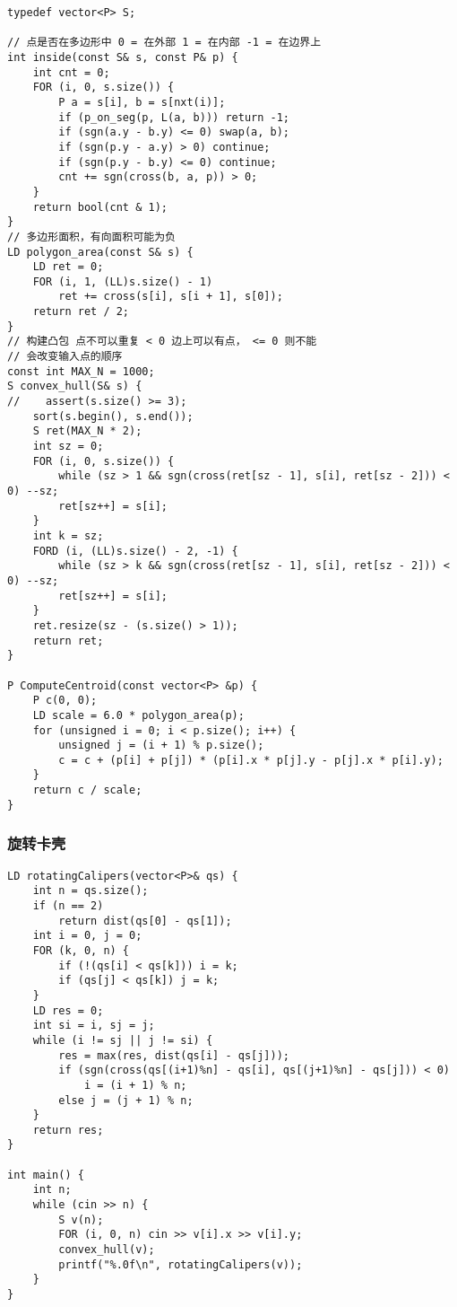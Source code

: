 \documentclass[]{article}
\begin{document}
\begin{verbatim}
typedef vector<P> S;

// 点是否在多边形中 0 = 在外部 1 = 在内部 -1 = 在边界上
int inside(const S& s, const P& p) {
    int cnt = 0;
    FOR (i, 0, s.size()) {
        P a = s[i], b = s[nxt(i)];
        if (p_on_seg(p, L(a, b))) return -1;
        if (sgn(a.y - b.y) <= 0) swap(a, b);
        if (sgn(p.y - a.y) > 0) continue;
        if (sgn(p.y - b.y) <= 0) continue;
        cnt += sgn(cross(b, a, p)) > 0;
    }
    return bool(cnt & 1);
}
// 多边形面积，有向面积可能为负
LD polygon_area(const S& s) {
    LD ret = 0;
    FOR (i, 1, (LL)s.size() - 1)
        ret += cross(s[i], s[i + 1], s[0]);
    return ret / 2;
}
// 构建凸包 点不可以重复 < 0 边上可以有点， <= 0 则不能
// 会改变输入点的顺序
const int MAX_N = 1000;
S convex_hull(S& s) {
//    assert(s.size() >= 3);
    sort(s.begin(), s.end());
    S ret(MAX_N * 2);
    int sz = 0;
    FOR (i, 0, s.size()) {
        while (sz > 1 && sgn(cross(ret[sz - 1], s[i], ret[sz - 2])) < 0) --sz;
        ret[sz++] = s[i];
    }
    int k = sz;
    FORD (i, (LL)s.size() - 2, -1) {
        while (sz > k && sgn(cross(ret[sz - 1], s[i], ret[sz - 2])) < 0) --sz;
        ret[sz++] = s[i];
    }
    ret.resize(sz - (s.size() > 1));
    return ret;
}

P ComputeCentroid(const vector<P> &p) {
    P c(0, 0);
    LD scale = 6.0 * polygon_area(p);
    for (unsigned i = 0; i < p.size(); i++) {
        unsigned j = (i + 1) % p.size();
        c = c + (p[i] + p[j]) * (p[i].x * p[j].y - p[j].x * p[i].y);
    }
    return c / scale;
}
\end{verbatim}

\hypertarget{ux65cbux8f6cux5361ux58f3}{%
\subsubsection{旋转卡壳}\label{ux65cbux8f6cux5361ux58f3}}

\begin{verbatim}
LD rotatingCalipers(vector<P>& qs) {
    int n = qs.size();
    if (n == 2)
        return dist(qs[0] - qs[1]);
    int i = 0, j = 0;
    FOR (k, 0, n) {
        if (!(qs[i] < qs[k])) i = k;
        if (qs[j] < qs[k]) j = k;
    }
    LD res = 0;
    int si = i, sj = j;
    while (i != sj || j != si) {
        res = max(res, dist(qs[i] - qs[j]));
        if (sgn(cross(qs[(i+1)%n] - qs[i], qs[(j+1)%n] - qs[j])) < 0)
            i = (i + 1) % n;
        else j = (j + 1) % n;
    } 
    return res;
}

int main() {
    int n;
    while (cin >> n) {
        S v(n);
        FOR (i, 0, n) cin >> v[i].x >> v[i].y;
        convex_hull(v);
        printf("%.0f\n", rotatingCalipers(v));
    }
}
\end{verbatim}
\end{document}
